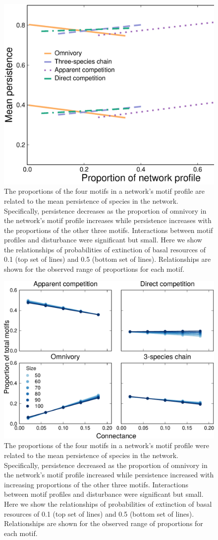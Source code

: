 \documentclass[12pt]{article}
\begin{document}
\begin{spacing}{2.0}
    \begin{figure}
        \centering
        \includegraphics[width=.5\textwidth]{figures/persistence_motif_profiles.eps}
        \caption{The proportions of the four motifs in a network's motif profile are related to the mean persistence of species in the network. Specifically, persistence decreases as the proportion of omnivory in the network's motif profile increases while persistence increases with the proportions of the other three motifs. Interactions between motif profiles and disturbance were significant but small. Here we show the relationships of probabilities of extinction of basal resources of 0.1 (top set of lines) and 0.5 (bottom set of lines). Relationships are shown for the observed range of proportions for each motif.}      
        \label{fig:motif_profile_persistence}
    \end{figure}    
    \begin{figure}[h!]
        \centering
        \includegraphics[width=.75\textwidth]{manuscript/figures/motif_proportion_lms.pdf}
        \caption{The proportions of the four motifs in a network's motif profile were related to the mean persistence of species in the network. Specifically, persistence decreased as the proportion of omnivory in the network's motif profile increased while persistence increased with increasing proportions of the other three motifs. Interactions between motif profiles and disturbance were significant but small. Here we show the relationships of probabilities of extinction of basal resources of 0.1 (top set of lines) and 0.5 (bottom set of lines). Relationships are shown for the observed range of proportions for each motif.}
        \label{motif_proportion_lms}
    \end{figure}


\end{spacing}
\end{document}
